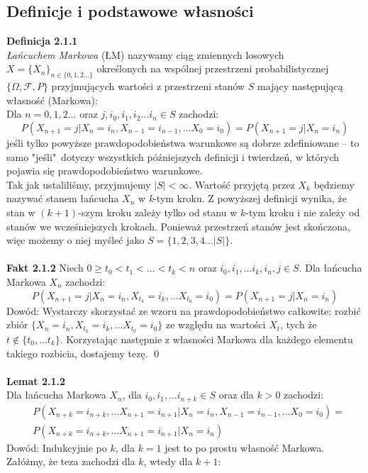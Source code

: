\documentclass[a4paper]{article}
\begin{document}
\subsection{Definicje i podstawowe własności}
\textbf{Definicja 2.1.1}\\
\textit{Łańcuchem Markowa} (ŁM) nazywamy ciąg zmiennych losowych $X = \{X_n\}_{n \in \{0,1,2...\}}$ określonych na wspólnej przestrzeni probabilistycznej $\{\Omega, \mathcal{F}, P\}$ przyjmujących wartości z przestrzeni stanów $S$ mający następującą własność (Markowa):\\
Dla $n = 0, 1, 2...$ oraz $j, i_0, i_1, i_2 ... i_n \in S$ zachodzi: $$P(X_{n+1} = j | X_n = i_n, X_{n-1} = i_{n-1}, ... X_0 = i_0) = P(X_{n+1} = j| X_{n} = i_n)$$
jeśli tylko powyższe prawdopodobieństwa warunkowe są dobrze zdefiniowane – to samo "jeśli"\, dotyczy wszystkich późniejszych definicji i twierdzeń, w których pojawia się prawdopodobieństwo warunkowe.
\\Tak jak ustaliliśmy, przyjmujemy $|S| <\infty$. Wartość przyjętą przez $X_k$ będziemy nazywać stanem łańcucha $X_n$ w \textit{k}-tym kroku. Z powyższej definicji wynika, że stan w $(k+1)$-szym kroku zależy tylko od stanu w $k$-tym kroku i nie zależy od stanów we wcześniejszych krokach. Ponieważ przestrzeń stanów jest skończona, więc możemy o niej myśleć jako $S = \{1,2,3,4...|S|\}$.
\\\\
\textbf{Fakt 2.1.2}
Niech $0 \geq t_0 < t_1 < ... < t_k < n$ oraz $i_0, i_1, ... i_k, i_n, j \in S$. Dla łańcucha Markowa $X_n$ zachodzi:
$$P(X_{n+1} = j | X_n = i_n, X_{t_{k}} = i_k, ... X_{t_0} = i_0) = P(X_{n+1} = j| X_{n} = i_n)$$
Dowód: Wystarczy skorzystać ze wzoru na prawdopodobieństwo całkowite: rozbić zbiór $\{X_n = i_n, X_{t_{k}} = i_k, ... X_{t_0} = i_0\}$ ze względu na wartości $X_t$, tych że $t \notin \{t_0, ... t_k\}$. Korzystając następnie z własności Markowa dla każdego elementu takiego rozbicia, dostajemy tezę. \qed
\\\\
\textbf{Lemat 2.1.2}\\
Dla łańcucha Markowa $X_n$, dla $i_0, i_1, ... i_{n+k} \in S$ oraz dla $k > 0$ zachodzi:
\begin{align*}
&P(X_{n+k} = i_{n+k}, ...X_{n+1} = i_{n+1} | X_n = i_n, X_{n-1} = i_{n-1}, ... X_0 = i_0)=\\
&P(X_{n+k} = i_{n+k}, ...X_{n+1} = i_{n+1} | X_n = i_n)
\end{align*}
Dowód: Indukcyjnie po $k$, dla $k = 1$ jest to po prostu własność Markowa. Załóżmy, że teza zachodzi dla $k$, wtedy dla $k+1$:
\end{document}
